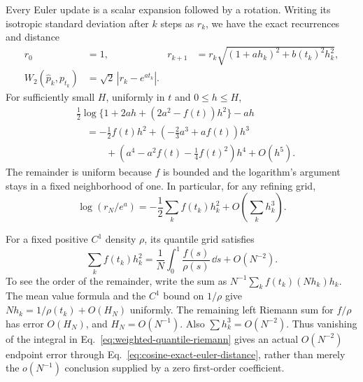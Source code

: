 Every Euler update is a scalar expansion followed by a rotation.
Writing its isotropic standard deviation after $k$ steps as $r_k$,
we have the exact recurrences and distance
\begin{align}
 r_0&=1,&
 r_{k+1}&=r_k\sqrt{(1+ah_k)^2+b(t_k)^2h_k^2},\nonumber\\
 W_2(\widehat p_k,p_{t_k})&=\sqrt2\,|r_k-e^{at_k}|.
 \label{eq:cosine-exact-euler-distance}
\end{align}
For sufficiently small $H$, uniformly in $t$ and $0\le h\le H$,
\begin{align}
 &\frac12\log\{1+2ah+(2a^2-f(t))h^2\}-ah\nonumber\\
 &\quad=-\frac12f(t)h^2
       +\left(-\frac23a^3+af(t)\right)h^3\nonumber\\
 &\qquad\quad+\left(a^4-a^2f(t)-\frac14f(t)^2\right)h^4
       +O(h^5).
 \label{eq:cosine-log-expansion}
\end{align}
The remainder is uniform because $f$ is bounded and the logarithm's
argument stays in a fixed neighborhood of one.  In particular, for
any refining grid,
\begin{equation}
 \log(r_N/e^a)=-\frac12\sum_kf(t_k)h_k^2
                     +O\left(\sum_kh_k^3\right).
 \label{eq:finite-schedule-log-error}
\end{equation}

For a fixed positive $C^1$ density $\rho$, its quantile grid satisfies
\begin{equation}
 \sum_kf(t_k)h_k^2
 =\frac1N\int_0^1\frac{f(s)}{\rho(s)}\,\dd s+O(N^{-2}).
 \label{eq:weighted-quantile-riemann}
\end{equation}
To see the order of the remainder, write the sum as
$N^{-1}\sum_k f(t_k)(Nh_k)h_k$.  The mean value formula and the
$C^1$ bound on $1/\rho$ give
$Nh_k=1/\rho(t_k)+O(H_N)$ uniformly.  The remaining left Riemann
sum for $f/\rho$ has error $O(H_N)$, and $H_N=O(N^{-1})$.
Also $\sum h_k^3=O(N^{-2})$.  Thus vanishing of the integral in
Eq.~\eqref{eq:weighted-quantile-riemann} gives an actual
$O(N^{-2})$ endpoint error through
Eq.~\eqref{eq:cosine-exact-euler-distance}, rather than merely the
$o(N^{-1})$ conclusion supplied by a zero first-order coefficient.

